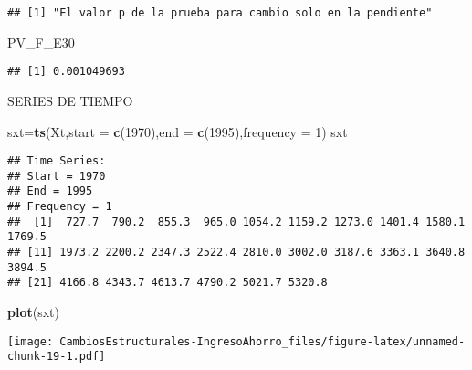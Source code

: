 \documentclass[
]{article}
\newenvironment{Shaded}{\begin{snugshade}}{\end{snugshade}}
\newcommand{\DataTypeTok}[1]{\textcolor[rgb]{0.13,0.29,0.53}{#1}}
\newcommand{\DecValTok}[1]{\textcolor[rgb]{0.00,0.00,0.81}{#1}}
\newcommand{\KeywordTok}[1]{\textcolor[rgb]{0.13,0.29,0.53}{\textbf{#1}}}
\newcommand{\NormalTok}[1]{#1}
\begin{document}
\begin{verbatim}
## [1] "El valor p de la prueba para cambio solo en la pendiente"
\end{verbatim}

\begin{Shaded}
\begin{Highlighting}[]
\NormalTok{PV_F_E30}
\end{Highlighting}
\end{Shaded}

\begin{verbatim}
## [1] 0.001049693
\end{verbatim}

SERIES DE TIEMPO

\begin{Shaded}
\begin{Highlighting}[]
\NormalTok{sxt=}\KeywordTok{ts}\NormalTok{(Xt,}\DataTypeTok{start =} \KeywordTok{c}\NormalTok{(}\DecValTok{1970}\NormalTok{),}\DataTypeTok{end =} \KeywordTok{c}\NormalTok{(}\DecValTok{1995}\NormalTok{),}\DataTypeTok{frequency =} \DecValTok{1}\NormalTok{)}
\NormalTok{sxt}
\end{Highlighting}
\end{Shaded}

\begin{verbatim}
## Time Series:
## Start = 1970 
## End = 1995 
## Frequency = 1 
##  [1]  727.7  790.2  855.3  965.0 1054.2 1159.2 1273.0 1401.4 1580.1 1769.5
## [11] 1973.2 2200.2 2347.3 2522.4 2810.0 3002.0 3187.6 3363.1 3640.8 3894.5
## [21] 4166.8 4343.7 4613.7 4790.2 5021.7 5320.8
\end{verbatim}

\begin{Shaded}
\begin{Highlighting}[]
\KeywordTok{plot}\NormalTok{(sxt)}
\end{Highlighting}
\end{Shaded}

\texttt{[image: CambiosEstructurales-IngresoAhorro\_files/figure-latex/unnamed-chunk-19-1.pdf]}
\end{document}
